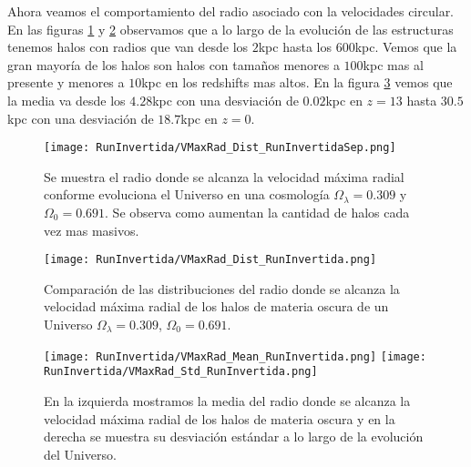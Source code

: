 Ahora veamos el comportamiento del radio asociado con la velocidades circular. En las figuras \ref{fig:Invertida-VMaxRadDistSep} y \ref{fig:Invertida-VMaxRadDist} observamos que a lo largo de la evolución de las estructuras tenemos halos con radios que van desde los $2$kpc hasta los $600$kpc. Vemos que la gran mayoría de los halos son halos con tamaños menores a $100$kpc mas al presente y menores a $10$kpc en los redshifts mas altos. En la figura \ref{fig:Invertida-VMaxRadStats} vemos que la media va desde los $4.28$kpc con una desviación de $0.02$kpc en $z=13$ hasta $30.5$kpc con una desviación de $18.7$kpc en $z=0$.

\begin{figure}[H]
    \centering
    \texttt{[image: RunInvertida/VMaxRad\_Dist\_RunInvertidaSep.png]}
    \caption[Radio donde se alcanza la velocidad máxima radial en la evolución de un Universo $\Omega_\lambda = 0.309 $, $\Omega_0 = 0.691$]{\footnotesize Se muestra el radio donde se alcanza la velocidad máxima radial conforme evoluciona el Universo en una cosmología $\Omega_\lambda = 0.309 $ y $\Omega_0 = 0.691$. Se observa como aumentan la cantidad de halos cada vez mas masivos.}
    \label{fig:Invertida-VMaxRadDistSep}
\end{figure}

\begin{figure}[H]
    \centering
    \texttt{[image: RunInvertida/VMaxRad\_Dist\_RunInvertida.png]}
    \caption[Distribución del radio donde se alcanza la velocidad máxima radial de un Universo $\Omega_\lambda = 0.309 $, $\Omega_0 = 0.691$]{\footnotesize Comparación de las distribuciones del radio donde se alcanza la velocidad máxima radial de los halos de materia oscura de un Universo $\Omega_\lambda = 0.309 $, $\Omega_0 = 0.691$.}
    \label{fig:Invertida-VMaxRadDist}
\end{figure}

\begin{figure}[H]
    \centering
    \texttt{[image: RunInvertida/VMaxRad\_Mean\_RunInvertida.png]}
    \texttt{[image: RunInvertida/VMaxRad\_Std\_RunInvertida.png]}
    \caption[Media y desviación estándar del Radio donde se alcanza la velocidad máxima radial de un Universo $\Omega_\lambda = 0.309 $, $\Omega_0 = 0.691$]{\footnotesize En la izquierda mostramos la media del radio donde se alcanza la velocidad máxima radial de los halos de materia oscura y en la derecha se muestra su desviación estándar a lo largo de la evolución del Universo.}
    \label{fig:Invertida-VMaxRadStats}
\end{figure}

